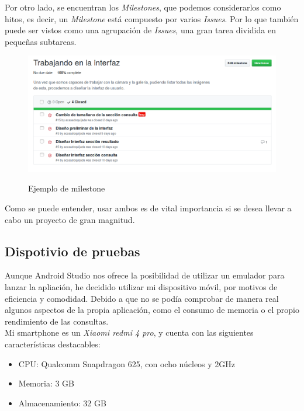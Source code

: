 Por otro lado, se encuentran los \textit{Milestones}, que podemos considerarlos como hitos, es decir, un \textit{Milestone} está compuesto por varios \textit{Issues}. Por lo que también puede ser vistos como una agrupación de \textit{Issues}, una gran tarea dividida en pequeñas subtareas.\\

\begin{figure}[H] %
\centering
\includegraphics[scale=0.4]{imagenes/milestone.png}  %
\label{milestone.png}
\caption{Ejemplo de milestone}
\end{figure}

Como se puede entender, usar ambos es de vital importancia si se desea llevar a cabo un proyecto de gran magnitud.

\subsection{Dispotivio de pruebas}

Aunque Android Studio nos ofrece la posibilidad de utilizar un emulador para lanzar la apliación, he decidido utilizar mi dispositivo móvil, por motivos de eficiencia y comodidad. Debido a que no se podía comprobar de manera real algunos aspectos de la propia aplicación, como el consumo de memoria o el propio rendimiento de las consultas.\\

Mi smartphone es un \textit{Xiaomi redmi 4 pro}, y cuenta con las siguientes características destacables:

\begin{itemize}
\item CPU: Qualcomm Snapdragon 625, con ocho núcleos y 2GHz 
\item Memoria: 3 GB
\item Almacenamiento: 32 GB
\end{itemize}


